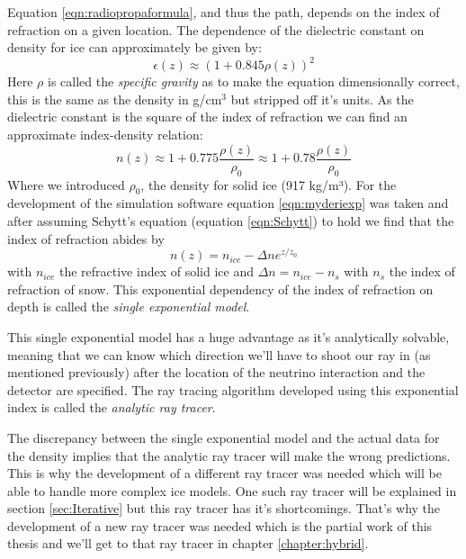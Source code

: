 Equation \ref{eqn:radiopropaformula}, and thus the path, depends on the index
of refraction on a given location.  The dependence of the dielectric constant
on density for ice can approximately be given by\cite{Robin}:
\begin{equation} 
	\epsilon(z) \approx (1 + 0.845\rho(z))^2 
\end{equation} 
Here $\rho$ is called the \textit{specific gravity} as to make the equation dimensionally correct,
this is the same as the density in g/cm$^3$ but stripped off it's units.
As the dielectric constant is the square of the index of refraction we can find an approximate index-density relation:
\begin{equation} 
	n(z) \approx 1 + 0.775\frac{\rho(z)}{\rho_0} \approx 1 + 0.78\frac{\rho(z)}{\rho_0} \label{eqn:Schytt}
\end{equation} 
Where we introduced $\rho_0$, the
density for solid ice (917 kg/m³).  For the development of the simulation
software equation \ref{eqn:myderiexp} was taken and after assuming Schytt's
equation (equation \ref{eqn:Schytt}) to hold we find that the index of refraction abides by
\begin{equation}
	\label{eqn:expn}
	n(z) = n_{ice} - \Delta n e^{z/z_0}
\end{equation}
with $n_{ice}$ the refractive index of solid ice and $\Delta n = n_{ice} - n_s$
with $n_s$ the index of refraction of snow. This exponential dependency of the
index of refraction on depth is called the \textit{single exponential model}.  

This single exponential model has a huge advantage as it's analytically
solvable, meaning that we can know which direction we'll have to shoot our ray
in (as mentioned previously) after the location of the neutrino interaction and
the detector are specified. The ray tracing algorithm developed using this
exponential index is called the \textit{analytic ray tracer}.

The discrepancy between the single exponential model and the actual data for
the density implies that the analytic ray tracer will make the wrong
predictions.  This is why the development of a different ray tracer was needed
which will be able to handle more complex ice models. One such ray tracer will
be explained in section \ref{sec:Iterative} but this ray tracer has it's
shortcomings. That's why the development of a new ray tracer was needed which
is the partial work of this thesis and we'll get to that ray tracer in chapter
\ref{chapter:hybrid}.

